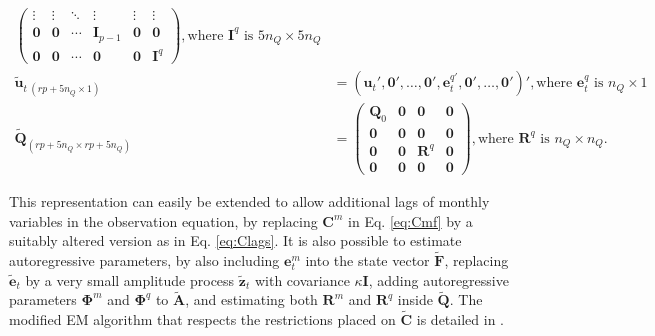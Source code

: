 \documentclass[a4paper]{article}
\begin{document}
\begin{align}
\begin{pmatrix}
\vdots & \vdots & \ddots & \vdots & \vdots & \vdots \\
\textbf{0} & \textbf{0} & \cdots & \textbf{I}_{p-1} & \textbf{0} & \textbf{0} \\
\textbf{0} & \textbf{0} & \cdots & \textbf{0} & \textbf{0} & \textbf{I}^q
\end{pmatrix}, \text{where $\textbf{I}^q$ is $5n_Q\times 5n_Q$} \\
\tilde{\textbf{u}}_{t\ (rp+5n_Q \times 1)}  &= (\textbf{u}_t', \textbf{0}', \dots, \textbf{0}', \textbf{e}^{q\prime}_t, \textbf{0}', \dots, \textbf{0}')', \text{where $\textbf{e}^q_t$ is $n_Q \times 1$} \\[1em]
\tilde{\textbf{Q}}_{(rp+5n_Q \times rp+5n_Q)}  &= \begin{pmatrix}
\textbf{Q}_0 & \textbf{0} & \textbf{0} & \textbf{0} \\
\textbf{0} & \textbf{0} & \textbf{0} & \textbf{0} \\
\textbf{0} & \textbf{0} & \textbf{R}^q & \textbf{0} \\ 
\textbf{0} & \textbf{0} & \textbf{0} & \textbf{0}
\end{pmatrix}, \text{where $\textbf{R}^q$ is $n_Q\times n_Q$.} 
\end{align}

This representation can easily be extended to allow additional lags of monthly variables in the observation equation, by replacing $\textbf{C}^m$ in Eq. \ref{eq:Cmf} by a suitably altered version as in Eq. \ref{eq:Clags}. It is also possible to estimate autoregressive parameters, by also including $\textbf{e}^m_t$ into the state vector $\tilde{\textbf{F}}$, replacing $\tilde{\textbf{e}}_t$ by a very small amplitude process $\tilde{\textbf{z}}_t$ with covariance $\kappa\textbf{I}$, adding autoregressive parameters $\mathbf{\Phi}^m$ and $\mathbf{\Phi}^q$ to $\tilde{\textbf{A}}$, and estimating both $\textbf{R}^m$ and $\textbf{R}^q$ inside $\tilde{\textbf{Q}}$. The modified EM algorithm that respects the restrictions placed on $\tilde{\textbf{C}}$ is detailed in \citet{banbura2014maximum}.




\end{document}

